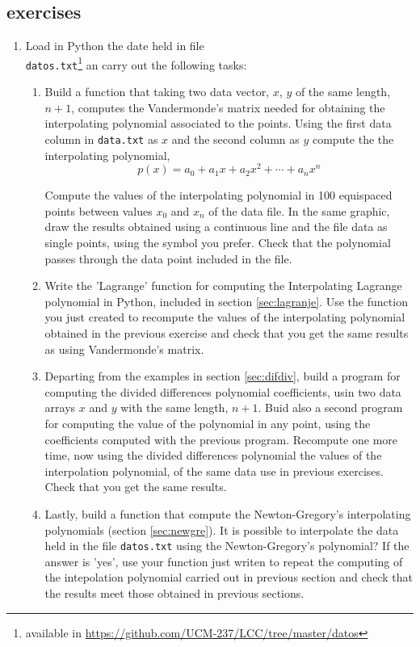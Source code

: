 \begin{paracol}{2}
\section{exercises}
\begin{enumerate}
	\item Load in Python the date held in file\\ \texttt{datos.txt}\footnote{available in \url{https://github.com/UCM-237/LCC/tree/master/datos}} an carry out the following tasks:
\begin{enumerate}
	\item Build a function that taking two data vector, $x$, $y$ of the same length, $n+1$, computes the Vandermonde's matrix needed for obtaining the interpolating polynomial associated to the points. Using the first data column in \texttt{data.txt} as $x$ and the second column as $y$ compute the the interpolating polynomial,
	\begin{equation*}
		p(x)=a_0+a_1x+a_2x^2+\cdots+a_nx^n
	\end{equation*}
	
	Compute the values of the interpolating polynomial in 100 equispaced points between values $x_0$ and $x_{n}$ of the data file. In the same gra\-phic, draw the results obtained using a continuous line and the file data as single points, using the symbol you prefer. Check that the polynomial passes through the data point included in the file.
	
	\item Write the 'Lagrange' function for computing the Interpolating Lagrange polynomial in Python, included in section \ref{sec:lagranje}. Use the function you just created to recompute the values of the interpolating polynomial obtained in the previous exercise and check that you get the same results as using Vandermonde's matrix.
	
	\item Departing from the examples in section \ref{sec:difdiv}, build a program for computing the divided differences polynomial coefficients, usin two data arrays $x$ and $y$ with the same length, $n+1$. Buid also a second program for computing the value of the polynomial in any point, using the coefficients computed with the previous program. Recompute one more time, now using the divided differences polynomial the values of the interpolation polynomial, of the same data use in previous exercises. Check that you get the same results.
	
	\item Lastly, build a function that compute the Newton-Gregory's interpolating polynomials (section \ref{sec:newgre}). It is possible to interpolate the data held in the file \texttt{datos.txt} using the Newton-Gregory's polynomial? If the answer is 'yes', use your function just writen to repeat the computing of the intepolation polynomial carried out in previous section and check that the results meet those obtained in previous sections.
	

\end{enumerate}
\end{enumerate}
\end{paracol}
